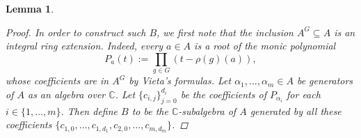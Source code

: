 \documentclass[12pt,a4paper]{amsart}
\theoremstyle{plain}
\newtheorem{lm}[thm]{Lemma}
\theoremstyle{definition}
\theoremstyle{remark}
\begin{document}
\begin{lm}
\begin{proof}
    In order to construct such $B$, we first note that the inclusion $A^{G} \subseteq A$ is an integral ring extension.
    Indeed, every $a \in A$ is a root of the monic polynomial
    \[ P_{a}(t) := \prod_{g \in G}(t - \rho(g)(a)), \]
    whose coefficients are in $A^{G}$ by Vieta's formulas.
    Let $\alpha_{1}, \ldots, \alpha_{m} \in A$ be generators of $A$ as an algebra over $\mathbb{C}$.
    Let $\{ c_{i,j} \}_{j = 0}^{d_{i}}$ be the coefficients of $P_{\alpha_{i}}$ for each $i \in \{1, \ldots, m\}$.
    Then define $B$ to be the $\mathbb{C}$-subalgebra of $A$ generated by all these coefficients $\{ c_{1,0}, \ldots, c_{1,d_{1}}, c_{2,0}, \ldots, c_{m,d_{m}} \}$.
  \end{proof}

\end{lm}



\vfill
\end{document}
